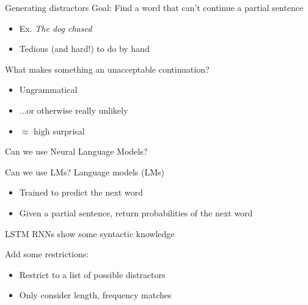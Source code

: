 \documentclass[12pt, xcolor=beamer,table,usenames,dvipsnames, ignorenonframetext, ngerman,t]{beamer}
\begin{document}
\begin{frame}{Generating distractors}
\pause
Goal: Find a word that can't continue a partial sentence
\begin{itemize}
	\item Ex.  \textit{The dog chased} \pause
	\item Tedious (and hard!) to do by hand
\end{itemize} \pause

What makes something an unacceptable continuation? \pause
\begin{itemize}
	\item Ungrammatical \pause
	\item ...or otherwise really unlikely \pause 
	\item $\approx$ high surprisal 
\end{itemize} \pause

Can we use Neural Language Models?
\end{frame}
%
\begin{frame}{Can we use LMs?}
	\pause
Language models (LMs)
\begin{itemize}
	\item Trained to predict the next word
	\item Given a partial sentence, return probabilities of the next word
\end{itemize}\pause

LSTM RNNs show some syntactic knowledge %
\pause

Add some restrictions:
\begin{itemize}
\item Restrict to a list of possible distractors
\item Only consider length, frequency matches
\end{itemize}
	
\end{frame}
%
\end{document}

